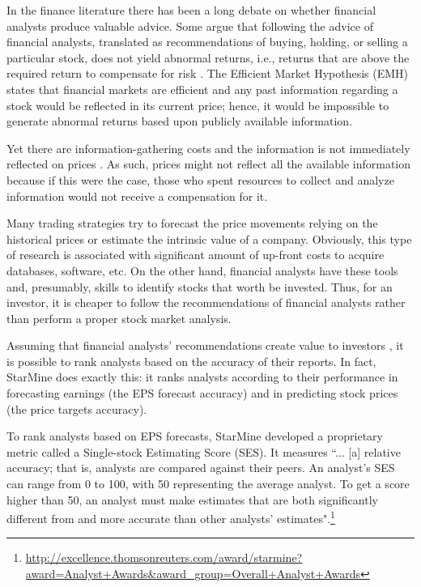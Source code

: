\documentclass{article}\usepackage[]{graphicx}\usepackage[]{color}
\begin{document}
In the finance literature there has been a long debate on whether financial analysts produce valuable  advice. Some argue that following the advice of financial analysts,  translated as recommendations of buying, holding, or selling a particular stock, does not yield  abnormal returns, i.e.,  returns that are above the required return to compensate for risk \citep{fama1970ecm}. The Efficient Market Hypothesis (EMH) states that financial markets are efficient and any past information  regarding a stock would  be reflected in its current price; hence, it would be  impossible to generate abnormal returns based upon publicly available information.

Yet there are information-gathering costs and the information is not immediately reflected on prices  \citep{grossman1980iie}. As such, prices might not  reflect all the available information because if this were the case, those who spent resources to collect and analyze   information would not receive a compensation for it.

Many trading strategies try to forecast the price movements relying on the historical prices or estimate the intrinsic value of a company. Obviously, this type of research is associated with significant amount of up-front costs to acquire databases, software, etc. On the other hand, financial analysts have these tools and, presumably, skills to identify  stocks that worth be invested. Thus, for an investor, it is cheaper to follow the recommendations of financial analysts rather than perform a proper stock market analysis.



Assuming that financial analysts' recommendations create value to investors \citep{womack1996,barber2001}, it is possible to rank analysts based on the accuracy of their reports. In fact, StarMine does exactly this: it ranks analysts according to their performance in forecasting earnings (the EPS forecast accuracy) and in predicting stock prices (the price targets accuracy).

To rank analysts based on EPS forecasts, StarMine developed a proprietary metric called a Single-stock Estimating Score (SES). It measures ``... [a] relative accuracy; that is, analysts are compared against their peers. An analyst's SES can range from 0 to 100, with 50 representing the average analyst. To get a score higher than 50, an analyst must make estimates that are both significantly different from and more accurate than other analysts' estimates".\footnote{\url{http://excellence.thomsonreuters.com/award/starmine?award=Analyst+Awards&award_group=Overall+Analyst+Awards}}
\end{document}
